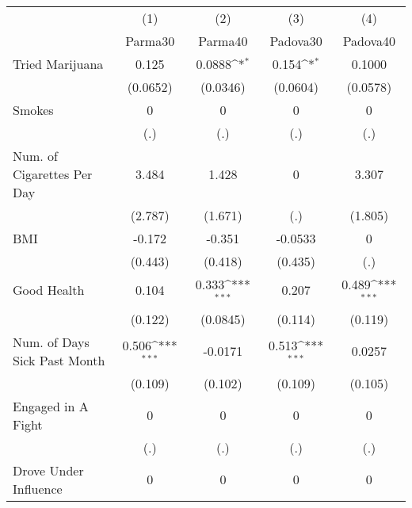 {
\def\sym#1{\ifmmode^{#1}\else\(^{#1}\)\fi}
\begin{tabular}{l*{4}{c}}
\hline\hline
            &\multicolumn{1}{c}{(1)}&\multicolumn{1}{c}{(2)}&\multicolumn{1}{c}{(3)}&\multicolumn{1}{c}{(4)}\\
            &\multicolumn{1}{c}{Parma30}&\multicolumn{1}{c}{Parma40}&\multicolumn{1}{c}{Padova30}&\multicolumn{1}{c}{Padova40}\\
\hline
Tried Marijuana&       0.125         &      0.0888\sym{*}  &       0.154\sym{*}  &      0.1000         \\
            &    (0.0652)         &    (0.0346)         &    (0.0604)         &    (0.0578)         \\
[1em]
Smokes      &           0         &           0         &           0         &           0         \\
            &         (.)         &         (.)         &         (.)         &         (.)         \\
[1em]
Num. of Cigarettes Per Day&       3.484         &       1.428         &           0         &       3.307         \\
            &     (2.787)         &     (1.671)         &         (.)         &     (1.805)         \\
[1em]
BMI         &      -0.172         &      -0.351         &     -0.0533         &           0         \\
            &     (0.443)         &     (0.418)         &     (0.435)         &         (.)         \\
[1em]
Good Health &       0.104         &       0.333\sym{***}&       0.207         &       0.489\sym{***}\\
            &     (0.122)         &    (0.0845)         &     (0.114)         &     (0.119)         \\
[1em]
Num. of Days Sick Past Month&       0.506\sym{***}&     -0.0171         &       0.513\sym{***}&      0.0257         \\
            &     (0.109)         &     (0.102)         &     (0.109)         &     (0.105)         \\
[1em]
Engaged in A Fight&           0         &           0         &           0         &           0         \\
            &         (.)         &         (.)         &         (.)         &         (.)         \\
[1em]
Drove Under Influence&           0         &           0         &           0         &           0         \\

\end{tabular}}
